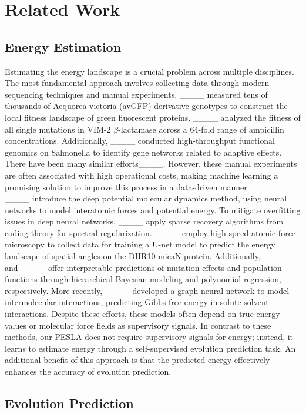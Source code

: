 \section{Related Work}
\subsection{Energy Estimation}

Estimating the energy landscape is a crucial problem across multiple disciplines. The most fundamental approach involves collecting data through modern sequencing techniques and manual experiments. ____ measured tens of thousands of Aequorea victoria (avGFP) derivative genotypes to construct the local fitness landscape of green fluorescent proteins. ____ analyzed the fitness of all single mutations in VIM-2 $\beta$-lactamase across a 64-fold range of ampicillin concentrations. Additionally, ____ conducted high-throughput functional genomics on Salmonella to identify gene networks related to adaptive effects. There have been many similar efforts____. However, these manual experiments are often associated with high operational costs, making machine learning a promising solution to improve this process in a data-driven manner____. ____ introduce the deep potential molecular dynamics method, using neural networks to model interatomic forces and potential energy. To mitigate overfitting issues in deep neural networks, ____ apply sparse recovery algorithms from coding theory for spectral regularization. ____ employ high-speed atomic force microscopy to collect data for training a U-net model to predict the energy landscape of spatial angles on the DHR10-micaN protein. Additionally, ____ and ____ offer interpretable predictions of mutation effects and population functions through hierarchical Bayesian modeling and polynomial regression, respectively. More recently, ____ developed a graph neural network to model intermolecular interactions, predicting Gibbs free energy in solute-solvent interactions. Despite these efforts, these models often depend on true energy values or molecular force fields as supervisory signals. In contrast to these methods, our PESLA does not require supervisory signals for energy; instead, it learns to estimate energy through a self-supervised evolution prediction task. An additional benefit of this approach is that the predicted energy effectively enhances the accuracy of evolution prediction.

\subsection{Evolution Prediction}


